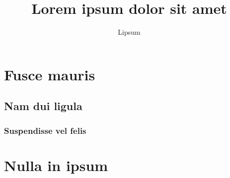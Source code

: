 \documentclass{scrartcl}
\author{Lipsum}
\title{Lorem ipsum dolor sit amet}
\begin{document}

\maketitle

\begin{abstract}
\lipsum[23]
\end{abstract}

\newpage

\section{Fusce mauris}
\lipsum[6]
\lipsum[7]

\subsection{Nam dui ligula}
\lipsum[56]
\lipsum[57]
\lipsum[58]

\subsubsection{Suspendisse vel felis}
\lipsum[12]
\lipsum[13]

\section{Nulla in ipsum}
\lipsum[14]
\end{document}
